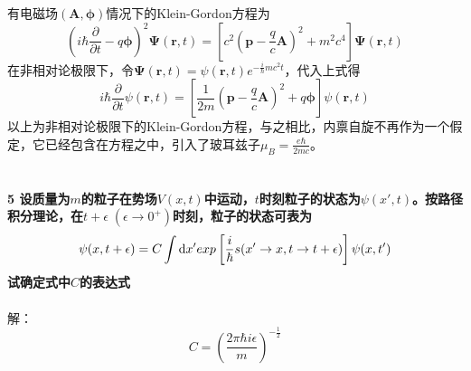 \documentclass[12pt]{article}
\numberwithin{equation}{section}	 %
\begin{document}
\begin{spacing}{1.5}
有电磁场$\left(\bm{A},\bm\phi\right)$情况下的Klein-Gordon方程为
\begin{equation}
\left(i\hbar\frac{\partial}{\partial t}-q\bm\phi\right)^{2} \bm\Psi\left(\bm{r},t\right) = \left[c^{2}\left(\bm{p}-\frac{q}{c}\bm{A}\right)^{2}+m^{2}c^{4}\right] \bm\Psi\left(\bm{r},t\right)
\end{equation}
在非相对论极限下，令$\displaystyle \bm\Psi\left(\bm{r},t\right) = \psi\left(\bm{r},t\right)e^{-\frac{i}{\hbar}mc^{2}t}$，代入上式得
\begin{equation}
i\hbar\frac{\partial}{\partial t}\psi\left(\bm{r},t\right) = \left[\frac{1}{2m}\left( \bm{p}-\frac{q}{c}\bm{A} \right)^{2}+q\bm\phi\right]\psi\left(\bm{r},t\right)
\end{equation}
以上为非相对论极限下的Klein-Gordon方程，与之相比，内禀自旋不再作为一个假定，它已经包含在方程之中，引入了玻耳兹子$\displaystyle \mu_{B}=\frac{e\hbar}{2mc}$。\\
~\\
~\\
\textbf{5 \quad 设质量为$m$的粒子在势场$V(x,t)$中运动，$t$时刻粒子的状态为$\psi(x',t)$。按路径积分理论，在$t+\epsilon\;(\epsilon \rightarrow 0^{+})$时刻，粒子的状态可表为
\begin{equation}\nonumber 		%
\psi(x,t+\epsilon) = C\int\dif x' exp\left[\frac{i}{\hbar}s(x'\rightarrow x,t\rightarrow t+\epsilon)\right] \psi(x,t')
\end{equation}
试确定式中$C$的表达式}\\
~\\
解：\begin{equation}
C=\left(\frac{2\pi\hbar i\epsilon}{m}\right)^{-\frac{1}{2}}
\end{equation}



\newpage

\end{spacing}
\end{document}

